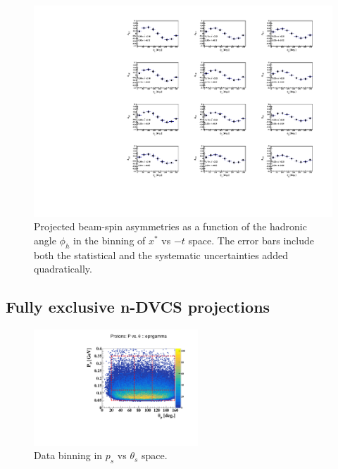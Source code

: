\begin{figure}[htb]
  \centering
    \includegraphics[width=1.1\textwidth,clip]{figs/pdf/BSA_incoherent_Phi_x_t.pdf}
  \caption{Projected beam-spin asymmetries as a function of the hadronic angle 
   $\phi_h$ in the binning of $x^{*}$ vs $-t$ space. The error bars include 
   both the statistical and the systematic uncertainties added quadratically.
   \label{fig:alu_tagged}}
\end{figure}




\subsection{Fully exclusive n-DVCS projections}

\begin{figure}[htb]
  \centering
\includegraphics[width=0.55\textwidth,clip,trim=0mm 0mm 0mm 
   20mm]{figs_epngamma/pdf/epngamma_p_p_theta.pdf}
  \caption{Data binning in $p_s$ vs $\theta_s$ space.
   \label{fig:binning_x_t}}
\end{figure}

